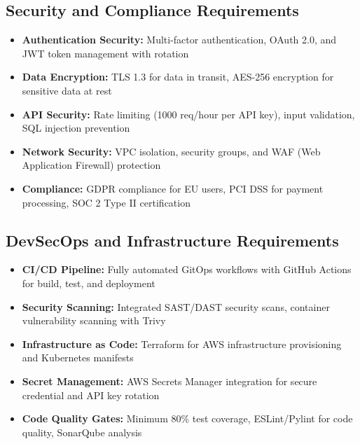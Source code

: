 \subsection{Security and Compliance Requirements}
\begin{itemize}
    \item \textbf{Authentication Security:} Multi-factor authentication, OAuth 2.0, and JWT token management with rotation
    \item \textbf{Data Encryption:} TLS 1.3 for data in transit, AES-256 encryption for sensitive data at rest
    \item \textbf{API Security:} Rate limiting (1000 req/hour per API key), input validation, SQL injection prevention
    \item \textbf{Network Security:} VPC isolation, security groups, and WAF (Web Application Firewall) protection
    \item \textbf{Compliance:} GDPR compliance for EU users, PCI DSS for payment processing, SOC 2 Type II certification
\end{itemize}

\subsection{DevSecOps and Infrastructure Requirements}
\begin{itemize}
    \item \textbf{CI/CD Pipeline:} Fully automated GitOps workflows with GitHub Actions for build, test, and deployment
    \item \textbf{Security Scanning:} Integrated SAST/DAST security scans, container vulnerability scanning with Trivy
    \item \textbf{Infrastructure as Code:} Terraform for AWS infrastructure provisioning and Kubernetes manifests
    \item \textbf{Secret Management:} AWS Secrets Manager integration for secure credential and API key rotation
    \item \textbf{Code Quality Gates:} Minimum 80\% test coverage, ESLint/Pylint for code quality, SonarQube analysis
\end{itemize}

